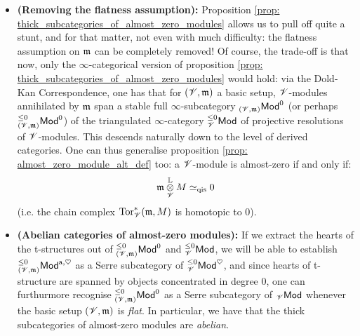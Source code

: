                     \begin{remark} \label{remark: almost_zero_modules_over_non_flat_basic_setups}
                        \noindent
                        \begin{itemize}
                            \item \textbf{(Removing the flatness assumption):} Proposition \ref{prop: thick_subcategories_of_almost_zero_modules} allows us to pull off quite a stunt, and for that matter, not even with much difficulty: the flatness assumption on $\mathfrak{m}$ can be completely removed! Of course, the trade-off is that now, only the $\infty$-categorical version of proposition \ref{prop: thick_subcategories_of_almost_zero_modules} would hold: via the Dold-Kan Correspondence, one has that for $(\mathscr{V}, \mathfrak{m})$ a basic setup, $\mathscr{V}$-modules annihilated by $\mathfrak{m}$ span a stable full $\infty$-subcategory ${}_{(\mathscr{V}, \mathfrak{m})}\mathsf{Mod}^0$ (or perhaps ${}^{\leq 0}_{(\mathscr{V}, \mathfrak{m})}\mathsf{Mod}^0$) of the triangulated $\infty$-category ${}^{\leq 0}_{\mathscr{V}}\mathsf{Mod}$ of projective resolutions of $\mathscr{V}$-modules. This descends naturally down to the level of derived categories. One can thus generalise proposition \ref{prop: almost_zero_module_alt_def} too: a $\mathscr{V}$-module is almost-zero if and only if:
                                $$\m \tensor_{\scrV}^{\L} M \cong_{\qis} 0$$
                            (i.e. the chain complex $\mathrm{Tor}_{\mathscr{V}}^*(\mathfrak{m}, M)$ is homotopic to $0$).
                            \item \textbf{(Abelian categories of almost-zero modules):} If we extract the hearts of the t-structures out of ${}^{\leq 0}_{(\mathscr{V}, \mathfrak{m})}\mathsf{Mod}^0$ and ${}^{\leq 0}_{\mathscr{V}}\mathsf{Mod}$, we will be able to establish ${}^{\leq 0}_{(\mathscr{V}, \mathfrak{m})}\mathsf{Mod}^{\mathrm{a}, \heartsuit}$ as a Serre subcategory of ${}^{\leq 0}_{\mathscr{V}}\mathsf{Mod}^{\heartsuit}$, and since hearts of t-structure are spanned by objects concentrated in degree $0$, one can furthurmore recognise ${}^{\leq 0}_{(\mathscr{V}, \mathfrak{m})}\mathsf{Mod}^0$ as a Serre subcategory of ${}_{\mathscr{V}}\mathsf{Mod}$ whenever the basic setup $(\mathscr{V}, \mathfrak{m})$ is \textit{flat}. In particular, we have that the thick subcategories of almost-zero modules are \textit{abelian}.
                        \end{itemize}
                    \end{remark}
                    
